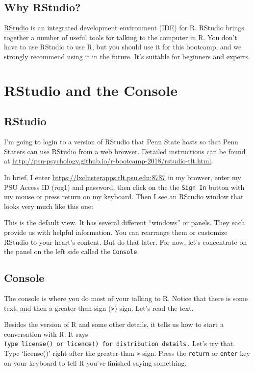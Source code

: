 \documentclass[]{article}
\begin{document}
\subsection{Why RStudio?}\label{why-rstudio}

\href{http://rstudio.com}{RStudio} is an integrated development
environment (IDE) for R. RStudio brings together a number of useful
tools for talking to the computer in R. You don't have to use RStudio to
use R, but you should use it for this bootcamp, and we strongly
recommend using it in the future. It's suitable for beginners and
experts.

\section{RStudio and the Console}\label{rstudio-and-the-console}

\subsection{RStudio}\label{rstudio}

I'm going to login to a version of RStudio that Penn State hosts so that
Penn Staters can use RStudio from a web browser. Detailed instructions
can be found at
\url{http://psu-psychology.github.io/r-bootcamp-2018/rstudio-tlt.html}.

In brief, I enter \url{https://lxclusterapps.tlt.psu.edu:8787} in my
browser, enter my PSU Access ID (rog1) and password, then click on the
the \texttt{Sign\ In} button with my mouse or press return on my
keyboard. Then I see an RStudio window that looks very much like this
one:

This is the default view. It has several different ``windows'' or
panels. They each provide us with helpful information. You can rearrange
them or customize RStudio to your heart's content. But do that later.
For now, let's concentrate on the panel on the left side called the
\texttt{Console}.

\subsection{Console}\label{console}

The console is where you do most of your talking to R. Notice that there
is some text, and then a greater-than sign (\texttt{\textgreater{}})
sign. Let's read the text.

Besides the version of R and some other details, it tells us how to
start a conversation with R. It says
\texttt{Type\ \textquotesingle{}license()\textquotesingle{}\ or\ \textquotesingle{}licence()\textquotesingle{}\ for\ distribution\ details.}
Let's try that. Type `license()' right after the greater-than
\texttt{\textgreater{}} sign. Press the \texttt{return} or
\texttt{enter} key on your keyboard to tell R you've finished saying
something.
\end{document}
